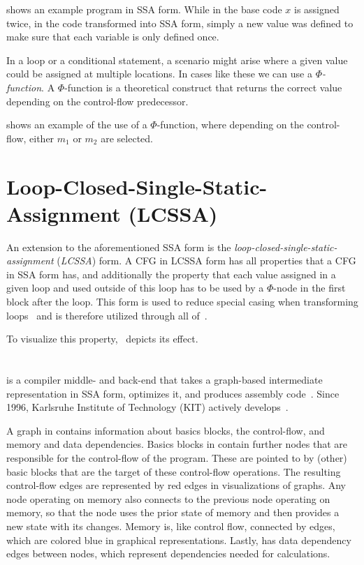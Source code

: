  shows an example program in SSA form.
While in the base code $x$ is assigned twice, in the code transformed into SSA form, simply a new value was defined to make sure that each variable is only defined once.



In a loop or a conditional statement, a scenario might arise where a given value could be assigned at multiple locations.
In cases like these we can use a \textit{$\Phi$-function}.
A $\Phi$-function is a theoretical construct that returns the correct value depending on the control-flow predecessor.

 shows an example of the use of a $\Phi$-function, where depending on the control-flow, either $m_1$ or $m_2$  are selected.



\section{Loop-Closed-Single-Static-Assignment (LCSSA)}\label{sec:basics:LCSSA}

An extension to the aforementioned SSA form is the \textit{loop-closed-single-static-assignment} (\textit{LCSSA}) form.
A CFG in LCSSA form has all properties that a CFG in SSA form has, and additionally the property that each value assigned in a given loop and used outside of this loop has to be used by a $\Phi$-node in the first block after the loop.
This form is used to reduce special casing when transforming loops~\cite{aebi18bachelorarbeit} and is therefore utilized through all of~.

To visualize this property,~ depicts its effect.



\section{\libFIRM}\label{sec:basics:firm}

\libFIRM{} is a compiler middle- and back-end that takes a graph-based intermediate representation in SSA form, optimizes it, and produces assembly code~\cite{libfirm}.
Since 1996, Karlsruhe Institute of Technology (KIT) actively develops~\libFIRM.

A graph in \libFIRM{} contains information about basics blocks, the control-flow, and memory and data dependencies.
Basics blocks in \libFIRM{} contain further nodes that are responsible for the control-flow of the program.
These are pointed to by (other) basic blocks that are the target of these control-flow operations.
The resulting control-flow edges are represented by red edges in visualizations of \libFIRM{} graphs.
Any node operating on memory also connects to the previous node operating on memory, so that the node uses the prior state of memory and then provides a new state with its changes.
Memory is, like control flow, connected by edges, which are colored blue in graphical representations.
Lastly, \libFIRM{} has data dependency edges between nodes, which represent dependencies needed for calculations.

